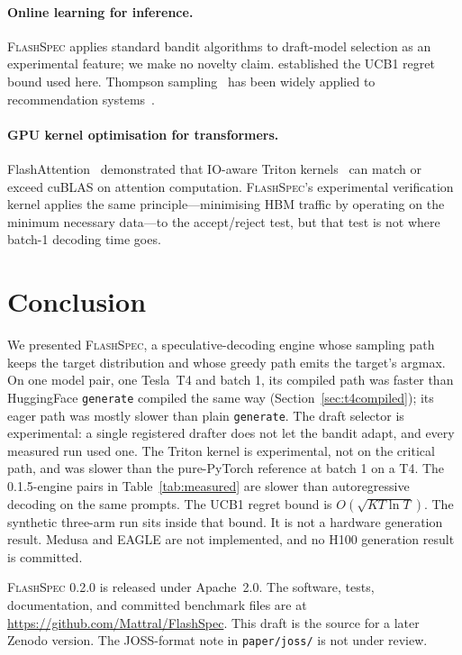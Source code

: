\documentclass[11pt]{article}
\newcommand{\flashspec}{\textsc{FlashSpec}}
\begin{document}
\paragraph{Online learning for inference.}
\flashspec{} applies standard bandit algorithms to draft-model selection
as an experimental feature; we make no novelty claim.
\citet{auer2002finite} established the UCB1 regret bound used here.
Thompson sampling~\citep{thompson1933} has been widely applied to
recommendation systems~\citep{chapelle2011thompson}.

\paragraph{GPU kernel optimisation for transformers.}
FlashAttention~\citep{dao2022flashattention} demonstrated that
IO-aware Triton kernels~\citep{triton2019} can match or exceed cuBLAS on
attention computation.
\flashspec{}'s experimental verification kernel applies the same
principle---minimising HBM traffic by operating on the minimum necessary
data---to the accept/reject test, but that test is not where batch-1
decoding time goes.

\section{Conclusion}
\label{sec:conclusion}

We presented \flashspec{}, a speculative-decoding engine whose sampling
path keeps the target distribution and whose greedy path emits the
target's argmax.
On one model pair, one Tesla~T4 and batch 1, its compiled path was faster
than HuggingFace \texttt{generate} compiled the same way
(Section~\ref{sec:t4compiled}); its eager path was mostly slower than
plain \texttt{generate}.
The draft selector is experimental: a single registered drafter does not
let the bandit adapt, and every measured run used one.
The Triton kernel is experimental, not on the critical path, and was
slower than the pure-PyTorch reference at batch 1 on a T4.
The 0.1.5-engine pairs in Table~\ref{tab:measured} are slower than
autoregressive decoding on the same prompts.
The UCB1 regret bound is $O(\sqrt{KT\ln T})$.
The synthetic three-arm run sits inside that bound.
It is not a hardware generation result.
Medusa and EAGLE are not implemented, and no H100 generation result is
committed.

\flashspec{} 0.2.0 is released under Apache~2.0.
The software, tests, documentation, and committed benchmark files are at
\url{https://github.com/Mattral/FlashSpec}.
This draft is the source for a later Zenodo version.
The JOSS-format note in \texttt{paper/joss/} is not under review.
\end{document}

